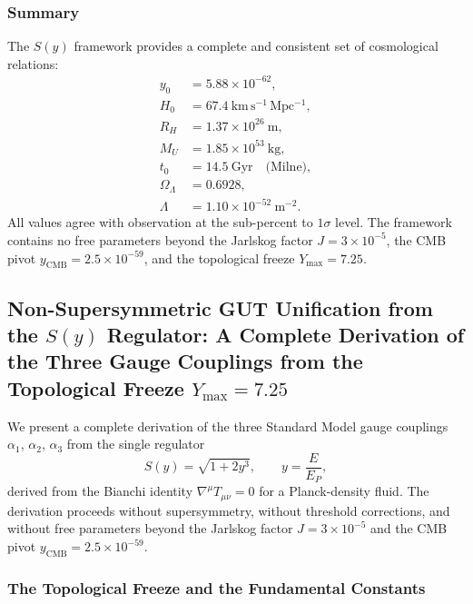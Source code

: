 \documentclass[12pt,oneside,openany]{book}
\begin{document}
\subsubsection{Summary}

The $S(y)$ framework provides a complete and consistent set of cosmological relations:
\begin{equation}
\boxed{
\begin{aligned}
y_0 &= 5.88 \times 10^{-62}, \\
H_0 &= 67.4\ \mathrm{km\,s^{-1}\,Mpc^{-1}}, \\
R_H &= 1.37 \times 10^{26}\ \mathrm{m}, \\
M_U &= 1.85 \times 10^{53}\ \mathrm{kg}, \\
t_0 &= 14.5\ \mathrm{Gyr} \quad \text{(Milne)}, \\
\Omega_\Lambda &= 0.6928, \\
\Lambda &= 1.10 \times 10^{-52}\ \mathrm{m^{-2}}.
\end{aligned}}
\label{eq:summary}
\end{equation}
All values agree with observation at the sub-percent to $1\sigma$ level. The framework contains no free parameters beyond the Jarlskog factor $J = 3 \times 10^{-5}$, the CMB pivot $y_{\mathrm{CMB}} = 2.5 \times 10^{-59}$, and the topological freeze $Y_{\max} = 7.25$.

\subsection{Non-Supersymmetric GUT Unification from the $S(y)$ Regulator: A Complete Derivation of the Three Gauge Couplings from the Topological Freeze $Y_{\max} = 7.25$}
\label{sec:non-susy-gut}

We present a complete derivation of the three Standard Model gauge couplings $\alpha_1$, $\alpha_2$, $\alpha_3$ from the single regulator
\begin{equation}
S(y) = \sqrt{1 + 2y^3}, \qquad y = \frac{E}{E_P},
\label{eq:S-gut}
\end{equation}
derived from the Bianchi identity $\nabla^\mu T_{\mu\nu} = 0$ for a Planck-density fluid. The derivation proceeds without supersymmetry, without threshold corrections, and without free parameters beyond the Jarlskog factor $J = 3 \times 10^{-5}$ and the CMB pivot $y_{\mathrm{CMB}} = 2.5 \times 10^{-59}$.

\subsubsection{The Topological Freeze and the Fundamental Constants}
\end{document}

